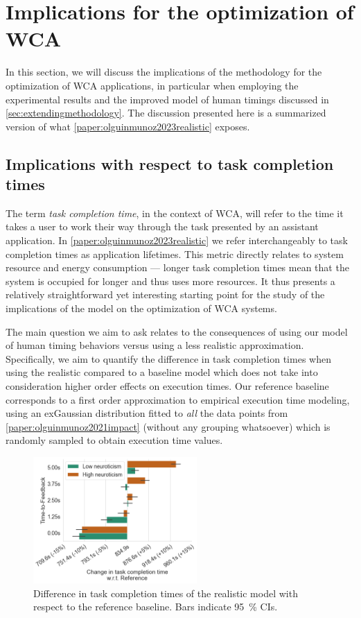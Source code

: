 \section{Implications for the optimization of \acs{WCA}}

In this section, we will discuss the implications of the methodology for the optimization of \gls{WCA} applications, in particular when employing the experimental results and the improved model of human timings discussed in \cref{sec:extendingmethodology}.
The discussion presented here is a summarized version of what \cref{paper:olguinmunoz2023realistic} exposes.


\subsection{Implications with respect to task completion times}

The term \emph{task completion time}, in the context of \gls{WCA}, will refer to the time it takes a user to work their way through the task presented by an assistant application.
In \cref{paper:olguinmunoz2023realistic} we refer interchangeably to task completion times as application lifetimes.
This metric directly relates to system resource and energy consumption --- longer task completion times mean that the system is occupied for longer and thus uses more resources.
It thus presents a relatively straightforward yet interesting starting point for the study of the implications of the model on the optimization of \gls{WCA} systems.

The main question we aim to ask relates to the consequences of using our model of human timing behaviors versus using a less realistic approximation.
Specifically, we aim to quantify the difference in task completion times when using the realistic compared to a baseline model which does not take into consideration higher order effects on execution times.
Our reference baseline corresponds to a first order approximation to empirical execution time modeling, using an \gls{exGaussian} distribution fitted to \emph{all} the data points from \cref{paper:olguinmunoz2021impact} (without any grouping whatsoever) which is randomly sampled to obtain execution time values.

\begin{figure}
    \centering
    \includegraphics[height=13em]{Figs/2023EdgeDroid2/task_durations_diff}
    \caption{Difference in task completion times of the realistic model with respect to the reference baseline.
    Bars indicate \SI{95}{\percent} \glspl{CI}.}\label{fig:taskcompletiontimesdiff}
\end{figure}

